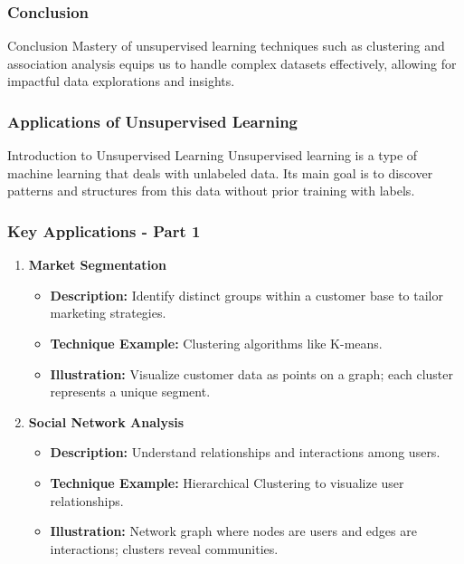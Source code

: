\documentclass[aspectratio=169]{beamer}
\begin{document}
\begin{frame}[fragile]
    \frametitle{Conclusion}
    \begin{block}{Conclusion}
        Mastery of unsupervised learning techniques such as clustering and association analysis equips us to handle complex datasets effectively, allowing for impactful data explorations and insights.
    \end{block}
\end{frame}

\begin{frame}[fragile]
    \frametitle{Applications of Unsupervised Learning}
    \begin{block}{Introduction to Unsupervised Learning}
        Unsupervised learning is a type of machine learning that deals with unlabeled data. Its main goal is to discover patterns and structures from this data without prior training with labels.
    \end{block}
\end{frame}

\begin{frame}[fragile]
    \frametitle{Key Applications - Part 1}
    \begin{enumerate}
        \item \textbf{Market Segmentation}
            \begin{itemize}
                \item \textbf{Description:} Identify distinct groups within a customer base to tailor marketing strategies.
                \item \textbf{Technique Example:} Clustering algorithms like K-means.
                \item \textbf{Illustration:} Visualize customer data as points on a graph; each cluster represents a unique segment.
            \end{itemize}
            
        \item \textbf{Social Network Analysis}
            \begin{itemize}
                \item \textbf{Description:} Understand relationships and interactions among users.
                \item \textbf{Technique Example:} Hierarchical Clustering to visualize user relationships.
                \item \textbf{Illustration:} Network graph where nodes are users and edges are interactions; clusters reveal communities.
            \end{itemize}
    \end{enumerate}
\end{frame}
\end{document}
